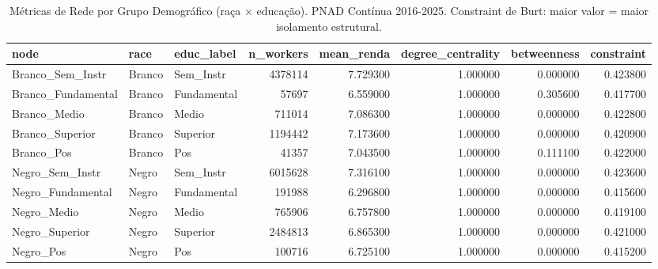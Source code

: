 \begin{table}
\caption{Métricas de Rede por Grupo Demográfico (raça × educação). PNAD Contínua 2016-2025. Constraint de Burt: maior valor = maior isolamento estrutural.}
\label{tab:sna_metricas}
\begin{tabular}{lllrrrrr}
\toprule
node & race & educ_label & n_workers & mean_renda & degree_centrality & betweenness & constraint \\
\midrule
Branco_Sem_Instr & Branco & Sem_Instr & 4378114 & 7.729300 & 1.000000 & 0.000000 & 0.423800 \\
Branco_Fundamental & Branco & Fundamental & 57697 & 6.559000 & 1.000000 & 0.305600 & 0.417700 \\
Branco_Medio & Branco & Medio & 711014 & 7.086300 & 1.000000 & 0.000000 & 0.422800 \\
Branco_Superior & Branco & Superior & 1194442 & 7.173600 & 1.000000 & 0.000000 & 0.420900 \\
Branco_Pos & Branco & Pos & 41357 & 7.043500 & 1.000000 & 0.111100 & 0.422000 \\
Negro_Sem_Instr & Negro & Sem_Instr & 6015628 & 7.316100 & 1.000000 & 0.000000 & 0.423600 \\
Negro_Fundamental & Negro & Fundamental & 191988 & 6.296800 & 1.000000 & 0.000000 & 0.415600 \\
Negro_Medio & Negro & Medio & 765906 & 6.757800 & 1.000000 & 0.000000 & 0.419100 \\
Negro_Superior & Negro & Superior & 2484813 & 6.865300 & 1.000000 & 0.000000 & 0.421000 \\
Negro_Pos & Negro & Pos & 100716 & 6.725100 & 1.000000 & 0.000000 & 0.415200 \\
\bottomrule
\end{tabular}
\end{table}
